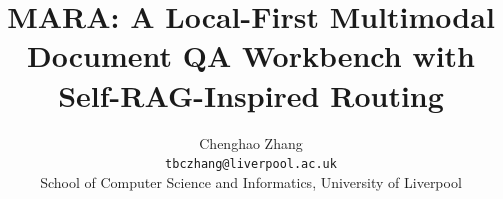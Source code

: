 \documentclass[11pt]{article}
\author{
Chenghao Zhang \\
\texttt{tbczhang@liverpool.ac.uk} \\
School of Computer Science and Informatics, University of Liverpool
}
\title{MARA: A Local-First Multimodal Document QA Workbench with Self-RAG-Inspired Routing}
\begin{document}
\maketitle



\raggedbottom


\appendix

\end{document}
